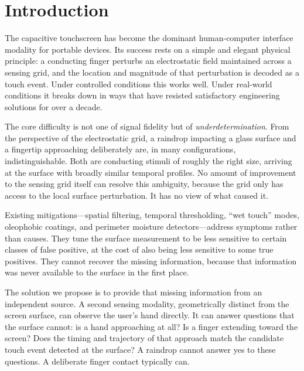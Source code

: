 \documentclass[11pt,letterpaper]{article}
\begin{document}
\newpage

\section{Introduction}

The capacitive touchscreen has become the dominant human-computer interface modality
for portable devices. Its success rests on a simple and elegant physical principle:
a conducting finger perturbs an electrostatic field maintained across a sensing grid,
and the location and magnitude of that perturbation is decoded as a touch event.
Under controlled conditions this works well. Under real-world conditions it breaks
down in ways that have resisted satisfactory engineering solutions for over a decade.

The core difficulty is not one of signal fidelity but of \emph{underdetermination}.
From the perspective of the electrostatic grid, a raindrop impacting a glass surface
and a fingertip approaching deliberately are, in many configurations,
indistinguishable. Both are conducting stimuli of roughly the right size, arriving
at the surface with broadly similar temporal profiles. No amount of improvement to
the sensing grid itself can resolve this ambiguity, because the grid only has access
to the local surface perturbation. It has no view of what caused it.

Existing mitigations---spatial filtering, temporal thresholding, ``wet touch''
modes, oleophobic coatings, and perimeter moisture detectors---address symptoms
rather than causes. They tune the surface measurement to be less sensitive to certain
classes of false positive, at the cost of also being less sensitive to some true
positives. They cannot recover the missing information, because that information was
never available to the surface in the first place.

The solution we propose is to provide that missing information from an independent
source. A second sensing modality, geometrically distinct from the screen surface,
can observe the user's hand directly. It can answer questions that the surface
cannot: is a hand approaching at all? Is a finger extending toward the screen? Does
the timing and trajectory of that approach match the candidate touch event detected
at the surface? A raindrop cannot answer yes to these questions. A deliberate finger
contact typically can.
\end{document}

